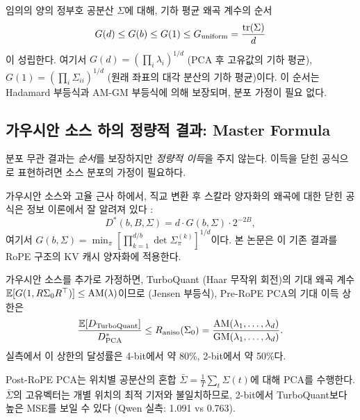 \begin{corollary}[블록 크기 계층 --- 분포 무관]
\label{cor:block_hierarchy}
임의의 양의 정부호 공분산 $\Sigma$에 대해, 기하 평균 왜곡 계수의 순서
\begin{equation}
G(d) \leq G(b) \leq G(1) \leq G_{\mathrm{uniform}} = \frac{\mathrm{tr}(\Sigma)}{d}
\end{equation}
이 성립한다. 여기서 $G(d) = (\prod_i \lambda_i)^{1/d}$ (PCA 후 고유값의 기하 평균), $G(1) = (\prod_i \Sigma_{ii})^{1/d}$ (원래 좌표의 대각 분산의 기하 평균)이다. 이 순서는 Hadamard 부등식과 AM-GM 부등식에 의해 보장되며, 분포 가정이 필요 없다.
\end{corollary}

\subsection{가우시안 소스 하의 정량적 결과: Master Formula}

분포 무관 결과는 \emph{순서}를 보장하지만 \emph{정량적 이득}을 주지 않는다. 이득을 닫힌 공식으로 표현하려면 소스 분포의 가정이 필요하다.

가우시안 소스와 고율 근사 하에서, 직교 변환 후 스칼라 양자화의 왜곡에 대한 닫힌 공식은 정보 이론에서 잘 알려져 있다 \citep{goyal2001transform,cover2006elements}:
\begin{equation}
D^*(b, B, \Sigma) = d \cdot G(b, \Sigma) \cdot 2^{-2B},
\label{eq:master_formula}
\end{equation}
여기서 $G(b, \Sigma) = \min_\pi [\prod_{k=1}^{d/b} \det \Sigma^{(k)}_\pi]^{1/d}$이다. 본 논문은 이 기존 결과를 RoPE 구조의 KV 캐시 양자화에 적용한다.

\begin{corollary}
\label{cor:gain_over_turbo}
가우시안 소스를 추가로 가정하면, TurboQuant (Haar 무작위 회전)의 기대 왜곡 계수 $\mathbb{E}[G(1, R\Sigma_0 R^\top)] \leq \mathrm{AM}(\lambda)$이므로 (Jensen 부등식), Pre-RoPE PCA의 기대 이득 상한은
\begin{equation}
\frac{\mathbb{E}[D_{\mathrm{TurboQuant}}]}{D^*_{\mathrm{PCA}}} \leq R_{\mathrm{aniso}}(\Sigma_0) = \frac{\mathrm{AM}(\lambda_1, \ldots, \lambda_d)}{\mathrm{GM}(\lambda_1, \ldots, \lambda_d)}.
\end{equation}
실측에서 이 상한의 달성률은 4-bit에서 약 80\%, 2-bit에서 약 50\%다.
\end{corollary}

\begin{remark}
\label{rem:post_rope_fails}
Post-RoPE PCA는 위치별 공분산의 혼합 $\bar{\Sigma} = \frac{1}{T}\sum_t \Sigma(t)$에 대해 PCA를 수행한다. $\bar{\Sigma}$의 고유벡터는 개별 위치의 최적 기저와 불일치하므로, 2-bit에서 TurboQuant보다 높은 MSE를 보일 수 있다 (Qwen 실측: 1.091 vs 0.763).
\end{remark}

